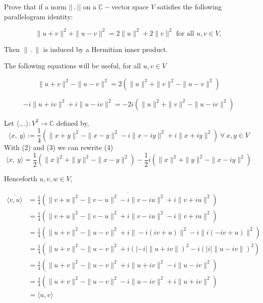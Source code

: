 \documentclass{article}
\newcommand\C{\mathbb{C}}
\begin{document}
Prove that if a norm $||\,.\,||$ on a $\C-$vector space $V$ satisfies
the following parallelogram identity:

\begin{equation}
  \|u+v\|^2+\|u-v\|^2 = 2\|u\|^2+2\|v\|^2\text{ for all }u,v \in V,
\end{equation}



Then $\|\,.\,\|$ is induced by a Hermitian inner product.


The following equations will be useful, for all $u,v\in V$

\begin{equation}
  \|u+v\|^2-\|u-v\|^2 = 2\left( \|u\|^2+\|v\|^2 - \|u-v\|^2 \right)
\end{equation}

\begin{equation}
  -i\|u+iv\|^2+i\|u-iv\|^2 = -2i\left( \|u\|^2+\|v\|^2 - \|u-iv\|^2 \right)
\end{equation}

Let $\langle . , .\rangle: V^2\rightarrow \C$ defined by,
\begin{equation}
  \langle x,\ y\rangle := {\frac
    {1}{4}}\left(\|x+y\|^{2}-\|x-y\|^{2}-i\|x-iy\|^{2}+i\|x+iy\|^{2}\right)\
  \forall \ x,y\in V
  \end{equation}
  With (2) and (3) we can rewrite (4)
\begin{equation}
  \langle x,\ y\rangle = {\frac
    {1}{2}}\left( \|x\|^2+\|y\|^2 -
     \|x-y\|^2 \right) -{\frac
    {1}{2}}i\left(
      \|x\|^2+\|y\|^2 - \|x-iy\|^2 \right)
\end{equation}



Henceforth $u,v,w\in V$,


\begin{align*}
  \overline{\langle v,u \rangle}
  &= \overline{{\frac
    {1}{4}}\left(\|v+u\|^{2}-\|v-u\|^{2}-i\|v-iu\|^{2}+i\|v+iu\|^{2}\right)}\\
  &= {\frac
    {1}{4}}\left(\|v+u\|^{2}-\|v-u\|^{2}+i\|v-iu\|^{2}-i\|v+iu\|^{2}\right)\\
  &= {\frac
    {1}{4}}\left(\|u+v\|^{2}-\|u-v\|^{2}+i\|-i(iv+u)\|^{2}-i\|i(-iv+u)\|^{2}\right)\\
  &= {\frac
    {1}{4}}\left(\|u+v\|^{2}-\|u-v\|^{2}+i(|-i|\|u+iv\|)^{2}-i(|i|\|u-iv\|)^{2}\right)\\
  &= {\frac
    {1}{4}}\left(\|u+v\|^{2}-\|u-v\|^{2}  +i\|u+iv\|^{2} -i\|u-iv\|^{2} \right)\\
  &= {\frac
    {1}{4}}\left(\|u+v\|^{2}-\|u-v\|^{2} -i\|u-iv\|^{2}
    +i\|u+iv\|^{2}\right)\\
  &= \langle u,v \rangle
\end{align*}
\end{document}
